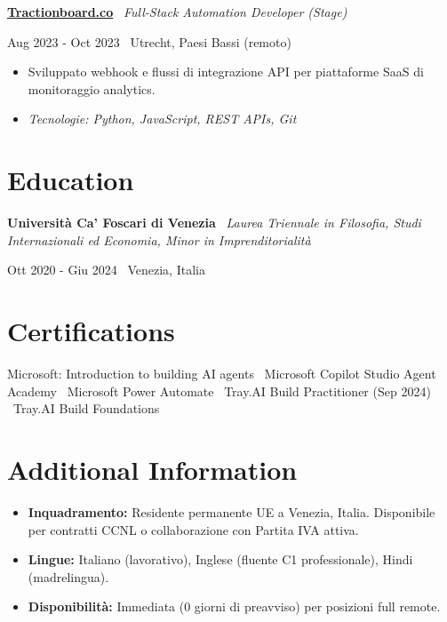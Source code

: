 \documentclass[a4paper,10pt]{article}
\newcommand{\role}[4]{%
  \vspace{2pt}\noindent
  \begin{minipage}[t]{0.70\textwidth}\raggedright\textbf{#1} \textbullet\ \textit{#3}\end{minipage}%
  \hfill
  \begin{minipage}[t]{0.28\textwidth}\raggedleft\footnotesize\color{gray}#2 \textbullet\ #4\end{minipage}%
  \vspace{1pt}%
}
\begin{document}
\role{\href{https://tractionboard.co}{Tractionboard.co}}{Aug 2023 - Oct 2023}{Full-Stack Automation Developer (Stage)}{Utrecht, Paesi Bassi (remoto)}
\begin{itemize}
  \item Sviluppato webhook e flussi di integrazione API per piattaforme SaaS di monitoraggio analytics.
  \item \textit{Tecnologie: Python, JavaScript, REST APIs, Git}
\end{itemize}

\section{Education}
\role{Università Ca' Foscari di Venezia}{Ott 2020 - Giu 2024}{Laurea Triennale in Filosofia, Studi Internazionali ed Economia, Minor in Imprenditorialità}{Venezia, Italia}

\section{Certifications}
Microsoft: Introduction to building AI agents \textbullet\ Microsoft Copilot Studio Agent Academy \textbullet\ Microsoft Power Automate \textbullet\ Tray.AI Build Practitioner (Sep 2024) \textbullet\ Tray.AI Build Foundations

\section{Additional Information}
\begin{itemize}
  \item \textbf{Inquadramento:} Residente permanente UE a Venezia, Italia. Disponibile per contratti CCNL o collaborazione con Partita IVA attiva.
  \item \textbf{Lingue:} Italiano (lavorativo), Inglese (fluente C1 professionale), Hindi (madrelingua).
  \item \textbf{Disponibilità:} Immediata (0 giorni di preavviso) per posizioni full remote.
\end{itemize}

\end{document}
